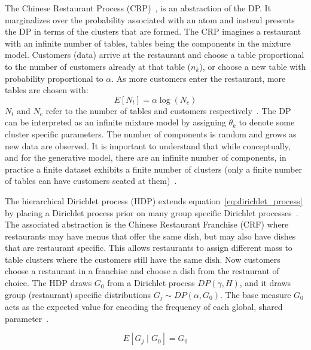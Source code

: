 The Chinese Restaurant Process (CRP)~\citep{neal2000markov, gershman2012tutorial}, is an abstraction of the DP. It marginalizes over the probability associated with an atom and instead presents the DP in terms of the clusters that are formed. The CRP imagines a restaurant with an infinite number of tables, tables being the components in the mixture model. Customers (data) arrive at the restaurant and choose a table proportional to the number of customers already at that table ($n_k$), or choose a new table with probability proportional to $\alpha$. As more customers enter the restaurant, more tables are chosen with:
\begin{equation}
  E[N_t] = \alpha \log(N_c)
\end{equation}
$N_t$ and $N_c$ refer to the number of tables and customers respectively~\citep{gershman2012tutorial}. The DP can be interpreted as an infinite mixture model by assigning $\theta_k$ to denote some cluster specific parameters. The number of components is random and grows as new data are observed. It is important to understand that while conceptually, and for the generative model, there are an infinite number of components, in practice a finite dataset exhibits a finite number of clusters (only a finite number of tables can have customers seated at them)~\citep{blei2006variational}.

The hierarchical Dirichlet process (HDP) extends equation~\ref{eq:dirichlet_process} by placing a Dirichlet process prior on many group specific Dirichlet processes~\citep{teh2005sharing}. The associated abstraction is the Chinese Restaurant Franchise (CRF) where restaurants may have menus that offer the same dish, but may also have dishes that are restaurant specific. This allows restaurants to assign different mass to table clusters where the customers still have the same dish. Now customers choose a restaurant in a franchise and choose a dish from the restaurant of choice. The HDP draws $G_0$ from a Dirichlet process $DP(\gamma, H)$, and it draws group (restaurant) specific distributions $G_j \sim DP(\alpha, G_0)$. The base measure $G_0$ acts as the expected value for encoding the frequency of each global, shared parameter~\citep{fox2007hierarchical}.

\begin{equation}
  E[G_j \mid G_0] = G_0
\end{equation}

